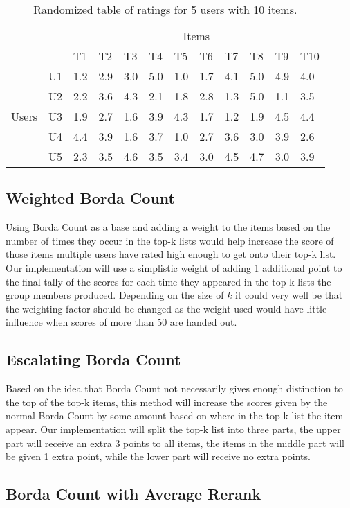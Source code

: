 \begin{table}[H]
	\centering
	\begin{tabular}{cl|l|l|l|l|l|l|l|l|l|l|}
		\cline{3-12}
		\multicolumn{1}{l}{}                         &    & \multicolumn{10}{c|}{Items}                               \\ \cline{3-12} 
		\multicolumn{1}{l}{}                         &    & T1  & T2  & T3  & T4  & T5  & T6  & T7  & T8  & T9  & T10 \\ \hline
		\multicolumn{1}{|c|}{\multirow{5}{*}{Users}} & U1 & 1.2 & 2.9 & 3.0 & 5.0 & 1.0 & 1.7 & 4.1 & 5.0 & 4.9 & 4.0 \\ \cline{2-12} 
		\multicolumn{1}{|c|}{}                       & U2 & 2.2 & 3.6 & 4.3 & 2.1 & 1.8 & 2.8 & 1.3 & 5.0 & 1.1 & 3.5 \\ \cline{2-12} 
		\multicolumn{1}{|c|}{}                       & U3 & 1.9 & 2.7 & 1.6 & 3.9 & 4.3 & 1.7 & 1.2 & 1.9 & 4.5 & 4.4 \\ \cline{2-12} 
		\multicolumn{1}{|c|}{}                       & U4 & 4.4 & 3.9 & 1.6 & 3.7 & 1.0 & 2.7 & 3.6 & 3.0 & 3.9 & 2.6 \\ \cline{2-12} 
		\multicolumn{1}{|c|}{}                       & U5 & 2.3 & 3.5 & 4.6 & 3.5 & 3.4 & 3.0 & 4.5 & 4.7 & 3.0 & 3.9 \\ \hline
	\end{tabular}
	\caption{Randomized table of ratings for 5 users with 10 items.}
	\label{randomratingstable}
\end{table}

\subsection{Weighted Borda Count}
Using Borda Count as a base and adding a weight to the items based on the number of times they occur in the top-k lists would help increase the score of those items multiple users have rated high enough to get onto their top-k list. Our implementation will use a simplistic weight of adding 1 additional point to the final tally of the scores for each time they appeared in the top-k lists the group members produced. Depending on the size of $k$ it could very well be that the weighting factor should be changed as the weight used would have little influence when scores of more than 50 are handed out.




\subsection{Escalating Borda Count}
Based on the idea that Borda Count not necessarily gives enough distinction to the top of the top-k items, this method will increase the scores given by the normal Borda Count by some amount based on where in the top-k list the item appear. Our implementation will split the top-k list into three parts, the upper part will receive an extra 3 points to all items, the items in the middle part will be given 1 extra point, while the lower part will receive no extra points.




\subsection{Borda Count with Average Rerank}
